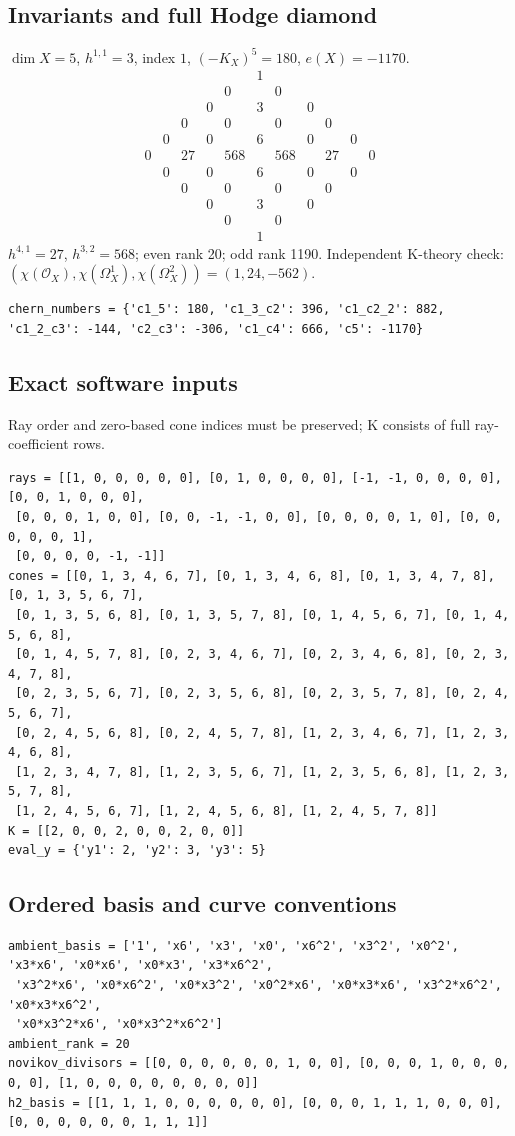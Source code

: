 \documentclass[10pt,a4paper]{article}
\begin{document}
\subsection*{Invariants and full Hodge diamond}
$\dim X=5$, $h^{1,1}=3$, index $1$, $(-K_X)^5=180$, $e(X)=-1170$.
\[\begin{array}{ccccccccccc}&&&&&1&&&&&\\&&&&0&&0&&&&\\&&&0&&3&&0&&&\\&&0&&0&&0&&0&&\\&0&&0&&6&&0&&0&\\0&&27&&568&&568&&27&&0\\&0&&0&&6&&0&&0&\\&&0&&0&&0&&0&&\\&&&0&&3&&0&&&\\&&&&0&&0&&&&\\&&&&&1&&&&&\end{array}\]
$h^{4,1}=27$, $h^{3,2}=568$; even rank 20; odd rank 1190.
Independent K-theory check: $(\chi(\mathcal O_X),\chi(\Omega_X^1),\chi(\Omega_X^2))=(1, 24, -562)$.
\begin{lstlisting}
chern_numbers = {'c1_5': 180, 'c1_3_c2': 396, 'c1_c2_2': 882, 'c1_2_c3': -144, 'c2_c3': -306, 'c1_c4': 666, 'c5': -1170}
\end{lstlisting}
\subsection*{Exact software inputs}
Ray order and zero-based cone indices must be preserved; K consists of full ray-coefficient rows.
\begin{lstlisting}
rays = [[1, 0, 0, 0, 0, 0], [0, 1, 0, 0, 0, 0], [-1, -1, 0, 0, 0, 0], [0, 0, 1, 0, 0, 0],
 [0, 0, 0, 1, 0, 0], [0, 0, -1, -1, 0, 0], [0, 0, 0, 0, 1, 0], [0, 0, 0, 0, 0, 1],
 [0, 0, 0, 0, -1, -1]]
cones = [[0, 1, 3, 4, 6, 7], [0, 1, 3, 4, 6, 8], [0, 1, 3, 4, 7, 8], [0, 1, 3, 5, 6, 7],
 [0, 1, 3, 5, 6, 8], [0, 1, 3, 5, 7, 8], [0, 1, 4, 5, 6, 7], [0, 1, 4, 5, 6, 8],
 [0, 1, 4, 5, 7, 8], [0, 2, 3, 4, 6, 7], [0, 2, 3, 4, 6, 8], [0, 2, 3, 4, 7, 8],
 [0, 2, 3, 5, 6, 7], [0, 2, 3, 5, 6, 8], [0, 2, 3, 5, 7, 8], [0, 2, 4, 5, 6, 7],
 [0, 2, 4, 5, 6, 8], [0, 2, 4, 5, 7, 8], [1, 2, 3, 4, 6, 7], [1, 2, 3, 4, 6, 8],
 [1, 2, 3, 4, 7, 8], [1, 2, 3, 5, 6, 7], [1, 2, 3, 5, 6, 8], [1, 2, 3, 5, 7, 8],
 [1, 2, 4, 5, 6, 7], [1, 2, 4, 5, 6, 8], [1, 2, 4, 5, 7, 8]]
K = [[2, 0, 0, 2, 0, 0, 2, 0, 0]]
eval_y = {'y1': 2, 'y2': 3, 'y3': 5}
\end{lstlisting}
\subsection*{Ordered basis and curve conventions}
\begin{lstlisting}
ambient_basis = ['1', 'x6', 'x3', 'x0', 'x6^2', 'x3^2', 'x0^2', 'x3*x6', 'x0*x6', 'x0*x3', 'x3*x6^2',
 'x3^2*x6', 'x0*x6^2', 'x0*x3^2', 'x0^2*x6', 'x0*x3*x6', 'x3^2*x6^2', 'x0*x3*x6^2',
 'x0*x3^2*x6', 'x0*x3^2*x6^2']
ambient_rank = 20
novikov_divisors = [[0, 0, 0, 0, 0, 0, 1, 0, 0], [0, 0, 0, 1, 0, 0, 0, 0, 0], [1, 0, 0, 0, 0, 0, 0, 0, 0]]
h2_basis = [[1, 1, 1, 0, 0, 0, 0, 0, 0], [0, 0, 0, 1, 1, 1, 0, 0, 0], [0, 0, 0, 0, 0, 0, 1, 1, 1]]
\end{lstlisting}
\end{document}
